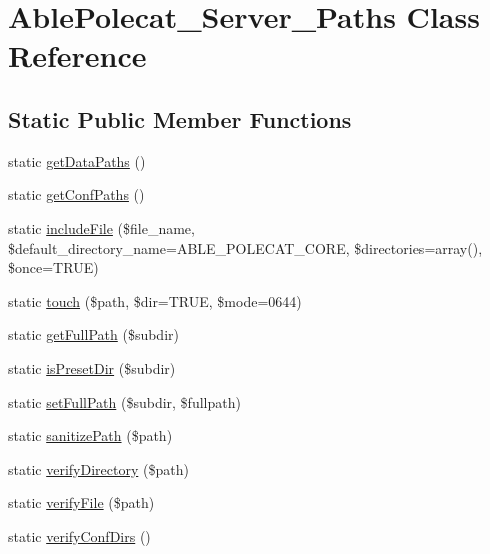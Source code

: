 \hypertarget{class_able_polecat___server___paths}{}\section{Able\+Polecat\+\_\+\+Server\+\_\+\+Paths Class Reference}
\label{class_able_polecat___server___paths}
\subsection*{Static Public Member Functions}
\begin{DoxyCompactItemize}
\item 
static \hyperlink{class_able_polecat___server___paths_acfec5baba6eace10bc70c68e2c16fb26}{get\+Data\+Paths} ()
\item 
static \hyperlink{class_able_polecat___server___paths_a9f0de77d2cb19e68fe9350b36902aeb1}{get\+Conf\+Paths} ()
\item 
static \hyperlink{class_able_polecat___server___paths_aa351e26bcb148d86b9012cfa2afc5c0a}{include\+File} (\$file\+\_\+name, \$default\+\_\+directory\+\_\+name=A\+B\+L\+E\+\_\+\+P\+O\+L\+E\+C\+A\+T\+\_\+\+C\+O\+R\+E, \$directories=array(), \$once=T\+R\+U\+E)
\item 
static \hyperlink{class_able_polecat___server___paths_acfe52200b485d8225aa496c32eb8a2a9}{touch} (\$path, \$dir=T\+R\+U\+E, \$mode=0644)
\item 
static \hyperlink{class_able_polecat___server___paths_a35d727621fa5ade2dc0db49de76f6efa}{get\+Full\+Path} (\$subdir)
\item 
static \hyperlink{class_able_polecat___server___paths_ac211d62ebb58a938e70515271cc42889}{is\+Preset\+Dir} (\$subdir)
\item 
static \hyperlink{class_able_polecat___server___paths_afd87b6381233edbcd2242b6f5fb84053}{set\+Full\+Path} (\$subdir, \$fullpath)
\item 
static \hyperlink{class_able_polecat___server___paths_ad24127f064ce2ac79c14ed8cc2daef82}{sanitize\+Path} (\$path)
\item 
static \hyperlink{class_able_polecat___server___paths_a9a24694bd21dcdec65220cccc346dbe5}{verify\+Directory} (\$path)
\item 
static \hyperlink{class_able_polecat___server___paths_a0b36b1a43f293fe2464ee77dd760fe05}{verify\+File} (\$path)
\item 
static \hyperlink{class_able_polecat___server___paths_ac27d7f69c6112d1c713537fbacc07c53}{verify\+Conf\+Dirs} ()
\end{DoxyCompactItemize}
